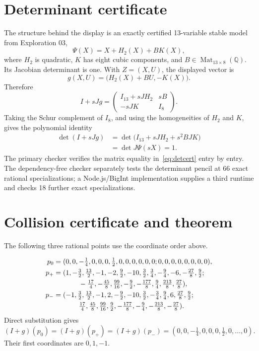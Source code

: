\documentclass[11pt]{article}
\newcommand{\Q}{\mathbb Q}
\begin{document}
\section{Determinant certificate}

The structure behind the display is an exactly certified 13-variable stable
model from Exploration 03,
\begin{equation}
 \Psi(X)=X+H_2(X)+BK(X), \label{eq:Psi}
\end{equation}
where $H_2$ is quadratic, $K$ has eight cubic components, and
$B\in\operatorname{Mat}_{13\times8}(\Q)$. Its Jacobian determinant is one.
With $Z=(X,U)$, the displayed vector is
\begin{equation}
 g(X,U)=\bigl(H_2(X)+BU,-K(X)\bigr). \label{eq:blockg}
\end{equation}
Therefore
\[
 I+sJg=\begin{pmatrix}I_{13}+sJH_2&sB\\-sJK&I_8\end{pmatrix}.
\]
Taking the Schur complement of $I_8$, and using the homogeneities of $H_2$
and $K$, gives the polynomial identity
\begin{align}
\det(I+sJg)
 &=\det\bigl(I_{13}+sJH_2+s^2BJK\bigr)\nonumber\\
 &=\det J\Psi(sX)=1. \label{eq:detcert}
\end{align}
The primary checker verifies the matrix equality in~\eqref{eq:detcert}
entry by entry. The dependency-free checker separately tests the determinant
pencil at 66 exact rational specializations; a Node.js/BigInt implementation
supplies a third runtime and checks 18 further exact specializations.

\section{Collision certificate and theorem}

The following three rational points use the coordinate order above.

\begingroup\small
\begin{align*}
p_0={}&(0,0,-\tfrac14,0,0,0,\tfrac12,0,0,0,0,0,0;
0,0,0,0,0,0,0,0),\\
p_+={}&(1,-\tfrac32,\tfrac{13}2,-1,-2,\tfrac92,-10,\tfrac32,\tfrac34,
-\tfrac94,-6,-\tfrac{27}8,\tfrac92;\\
&\hspace{8mm}-\tfrac{17}4,-\tfrac{45}8,\tfrac{99}{16},-\tfrac92,
-\tfrac{177}8,\tfrac94,\tfrac{213}8,\tfrac{27}8),\\
p_-={}&(-1,\tfrac32,\tfrac{13}2,-1,2,-\tfrac92,-10,\tfrac32,-\tfrac34,
\tfrac94,6,\tfrac{27}8,\tfrac92;\\
&\hspace{8mm}\tfrac{17}4,\tfrac{45}8,\tfrac{99}{16},\tfrac92,
-\tfrac{177}8,-\tfrac94,-\tfrac{213}8,-\tfrac{27}8).
\end{align*}
\endgroup
Direct substitution gives
\begin{equation}
 (I+g)(p_0)=(I+g)(p_+)=(I+g)(p_-)
 =(0,0,-\tfrac14,0,0,0,\tfrac12,0,\ldots,0). \label{eq:collision}
\end{equation}
Their first coordinates are $0,1,-1$.
\end{document}
